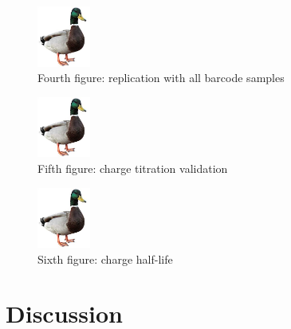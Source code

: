 \documentclass[9pt,lineno]{elife}
\begin{document}
\begin{figure}[ht!]
\centering
\includegraphics[height=2cm]{figures/duck.jpg}
\caption{
Fourth figure: replication with all barcode samples
}
\label{fig:fig4}
\end{figure}


\begin{figure}[ht!]
\centering
\includegraphics[height=2cm]{figures/duck.jpg}
\caption{
Fifth figure: charge titration validation
}
\label{fig:fig5}
\end{figure}


\begin{figure}[ht!]
\centering
\includegraphics[height=2cm]{figures/duck.jpg}
\caption{
Sixth figure: charge half-life
}
\label{fig:fig6}
\end{figure}














\section{Discussion}

\end{document}
